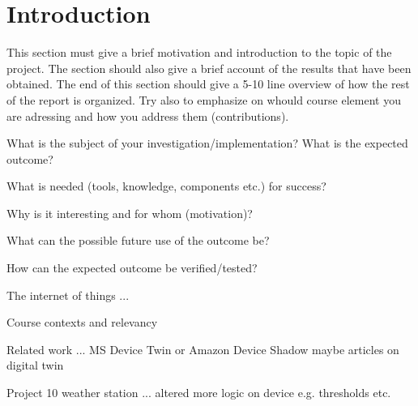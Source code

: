 \section{Introduction}
This section must give a brief motivation and
introduction to the topic of the project. The section should also give a brief account of the
results that have been obtained. The end of this section should give a 5-10 line overview of
how the rest of the report is organized. Try also to emphasize on whould course element
you are adressing and how you address them (contributions).

What is the subject of your investigation/implementation?
What is the expected outcome?

What is needed (tools, knowledge, components etc.) for success?

Why is it interesting and for whom (motivation)?

What can the possible future use of the outcome be?

How can the expected outcome be verified/tested?

The internet of things ...

Course contexts and relevancy

Related work ...  MS Device Twin or Amazon Device Shadow maybe articles on digital twin 

Project 10 weather station ... altered more logic on device e.g. thresholds etc.


